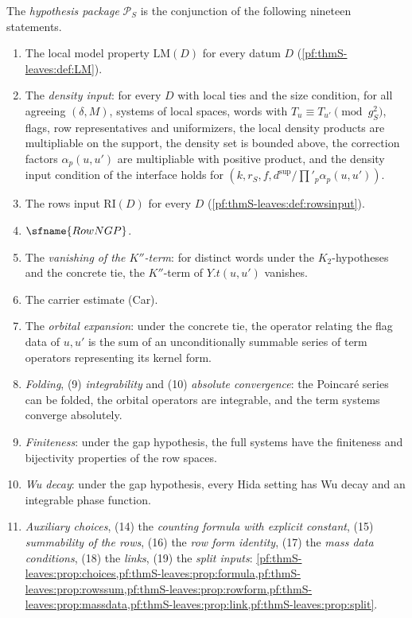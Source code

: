 \begin{definition}\label{pf:thmS-leaves:def:package}
The \emph{hypothesis package} $\mathcal P_S$ is the conjunction of the following nineteen statements.
\begin{enumerate}
\item The local model property $\mathrm{LM}(D)$ for every datum $D$ (\cref{pf:thmS-leaves:def:LM}).
\item The \emph{density input}: for every $D$ with local ties and the size condition, for all agreeing $(\delta,M)$, systems of local
spaces, words with $T_u\equiv T_{u'}\pmod{g_S^2}$, flags, row representatives and uniformizers, the local density products are
multipliable on the support, the density set is bounded above, the correction factors $\alpha_p(u,u')$ are multipliable with
positive product, and the density input condition of the interface holds for $(k,r_S,f,d^{\sup}/\prod'_p\alpha_p(u,u'))$.
\item The rows input $\mathrm{RI}(D)$ for every $D$ (\cref{pf:thmS-leaves:def:rowsinput}).
\item $\sfname{RowNGP}$.
\item The \emph{vanishing of the $K''$-term}: for distinct words under the $K_2$-hypotheses and the concrete tie, the $K''$-term of
$Y.t(u,u')$ vanishes.
\item The carrier estimate (Car).
\item The \emph{orbital expansion}: under the concrete tie, the operator relating the flag data of $u,u'$ is the sum of an
unconditionally summable series of term operators representing its kernel form.
\setcounter{enumi}{7}
\item \emph{Folding}, (9) \emph{integrability} and (10) \emph{absolute convergence}: the Poincar\'e series can be folded, the orbital
operators are integrable, and the term systems converge absolutely.
\setcounter{enumi}{10}
\item \emph{Finiteness}: under the gap hypothesis, the full systems have the finiteness and bijectivity properties of the row spaces.
\item \emph{Wu decay}: under the gap hypothesis, every Hida setting has Wu decay and an integrable phase function.
\item \emph{Auxiliary choices}, (14) the \emph{counting formula with explicit constant}, (15) \emph{summability of the rows}, (16) the
\emph{row form identity}, (17) the \emph{mass data conditions}, (18) the \emph{links}, (19) the \emph{split inputs}:
\cref{pf:thmS-leaves:prop:choices,pf:thmS-leaves:prop:formula,pf:thmS-leaves:prop:rowssum,pf:thmS-leaves:prop:rowform,pf:thmS-leaves:prop:massdata,pf:thmS-leaves:prop:link,pf:thmS-leaves:prop:split}.
\end{enumerate}
\end{definition}

